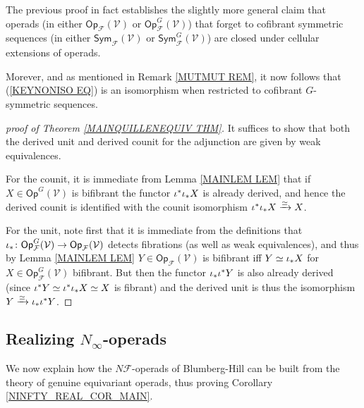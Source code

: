 \documentclass[a4paper,10pt]{article}%
\begin{document}
\begin{remark}
The previous proof in fact establishes 
the slightly more general claim that operads 
(in either 
$\mathsf{Op}_{\mathcal{F}}(\mathcal{V})$ or
$\mathsf{Op}_{\mathcal{F}}^G(\mathcal{V})$)
that forget to cofibrant symmetric sequences
(in either 
$\mathsf{Sym}_{\mathcal{F}}(\mathcal{V})$ or
$\mathsf{Sym}_{\mathcal{F}}^G(\mathcal{V})$)
are closed under cellular extensions of operads.

Morever, and as mentioned in Remark \ref{MUTMUT REM},
it now follows that (\ref{KEYNONISO EQ})
is an isomorphism when restricted to cofibrant $G$-symmetric sequences.
\end{remark}



\begin{proof}[proof of Theorem \ref{MAINQUILLENEQUIV THM}]
        It suffices to show that both the derived unit and derived counit for the adjunction are given by weak equivalences.

        For the counit, it is immediate from Lemma \ref{MAINLEM LEM} that if $X \in \mathsf{Op}^G(\mathcal{V})$ is bifibrant
        the functor $\iota^{\**} \iota_{\**} X$ is already derived, and hence the derived counit is identified with the counit isomorphism $\iota^{\**} \iota_{\**} X \xrightarrow{\simeq} X$.

        For the unit, note first that it is immediate from the definitions that 
        $\iota_{\**} \colon 
        \mathsf{Op}^{G}_{\mathcal{F}}(\mathcal{V})\to  
       \mathsf{Op}_{\mathcal{F}}(\mathcal{V})$
        detects fibrations (as well as weak equivalences), 
        and thus by Lemma \ref{MAINLEM LEM}
        $Y \in \mathsf{Op}_{\mathcal{F}}(\mathcal{V})$
        is bifibrant iff $Y \simeq \iota_{\**} X$
        for $X \in \mathsf{Op}^{G}_{\mathcal{F}}(\mathcal{V})$ bifibrant.
        But then the functor $\iota_{\**} \iota^{\**} Y$ 
        is also already derived (since $\iota^{\**} Y \simeq \iota^{\**}\iota_{\**} X \simeq X$ is fibrant) and the derived unit is thus the isomorphism
        $Y \xrightarrow{\simeq} \iota_{\**} \iota^{\**} Y$.
\end{proof}



\subsection{Realizing $N_{\infty}$-operads}
\label{NINFTY_SECTION}


We now explain how the $N\mathcal{F}$-operads of 
Blumberg-Hill can be built from the theory of genuine equivariant operads, thus proving Corollary \ref{NINFTY_REAL_COR_MAIN}.
\end{document}
